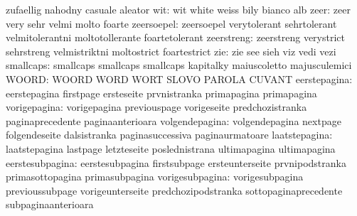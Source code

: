                            zufaellig                 nahodny
                           casuale                   aleator
                      wit: wit                       white
                           weiss                     bily
                           bianco                    alb
                     zeer: zeer                      very
                           sehr                      velmi
                           molto                     foarte
               zeersoepel: zeersoepel                verytolerant
                           sehrtolerant              velmitolerantni
                           moltotollerante           foartetolerant
               zeerstreng: zeerstreng                verystrict
                           sehrstreng                velmistriktni
                           moltostrict               foartestrict %
                      zie: zie                       see
                           sieh                      viz
                           vedi                      vezi
                smallcaps: smallcaps                 smallcaps
                           smallcaps                 kapitalky
                           maiuscoletto              majusculemici
                    WOORD: WOORD                     WORD
                           WORT                      SLOVO
                           PAROLA                    CUVANT
             eerstepagina: eerstepagina              firstpage
                           ersteseite                prvnistranka
                           primapagina               primapagina
             vorigepagina: vorigepagina              previouspage
                           vorigeseite               predchozistranka
                           paginaprecedente          paginaanterioara
           volgendepagina: volgendepagina            nextpage
                           folgendeseite             dalsistranka
                           paginasuccessiva          paginaurmatoare
            laatstepagina: laatstepagina             lastpage
                           letzteseite               poslednistrana
                           ultimapagina              ultimapagina
          eerstesubpagina: eerstesubpagina           firstsubpage
                           ersteunterseite           prvnipodstranka
                           primasottopagina          primasubpagina
          vorigesubpagina: vorigesubpagina           previoussubpage
                           vorigeunterseite          predchozipodstranka
                           sottopaginaprecedente     subpaginaanterioara
